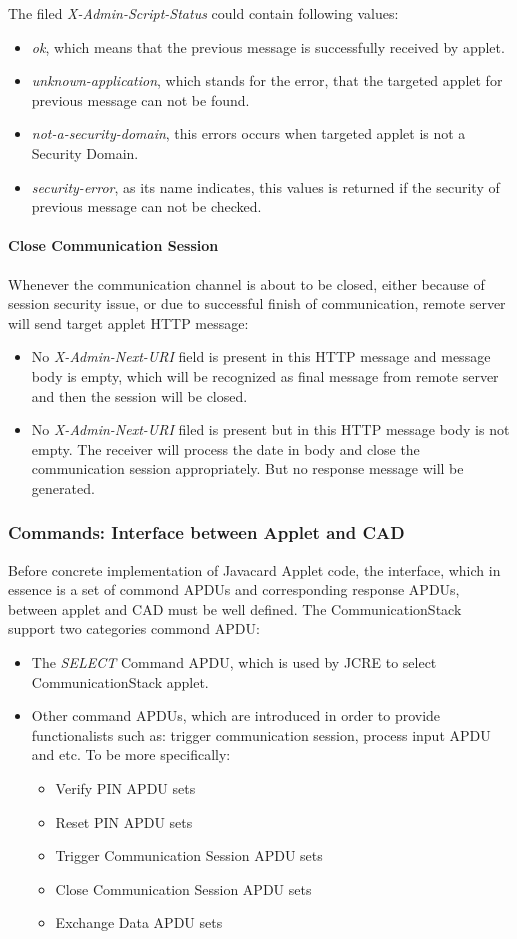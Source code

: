 \documentclass[]{llncs}
\begin{document}
The filed \emph{X-Admin-Script-Status} could contain following values:
 \begin{itemize}
  \item \emph{ok}, which means that the previous message is successfully received by applet.
  \item \emph{unknown-application}, which stands for the error, that the targeted applet for previous message can not be found.
\item \emph{not-a-security-domain}, this errors occurs when targeted applet is not a Security Domain.
\item \emph{security-error}, as its name indicates, this values is returned if the security of previous message  can not be checked.
\end{itemize}

\paragraph{Close Communication Session}
Whenever the communication channel is about to be closed, either because of session security issue, or due to successful finish of communication, remote server will send target applet HTTP message:
 \begin{itemize}
  \item No \emph{X-Admin-Next-URI} field is present in this HTTP message and message body is empty, which will be recognized as final message from remote server and then the session will be closed.
  \item No \emph{X-Admin-Next-URI} filed is present but in this HTTP message body is not empty. The receiver will process the date in body and close the communication session appropriately. But no response message will be generated.
\end{itemize}

\subsubsection {Commands: Interface between Applet and CAD}
Before concrete implementation of Javacard Applet code, the interface, which in essence is a set of commond APDUs and corresponding response APDUs, between applet and CAD must be well defined.  The CommunicationStack support two categories commond APDU:
 \begin{itemize}
  \item The \emph{SELECT} Command APDU, which is used by JCRE to select CommunicationStack applet.
  \item Other command APDUs, which are introduced in order to provide functionalists such as: trigger communication session, process input APDU and etc. To be more specifically:
\begin{itemize}
  \item Verify PIN APDU sets
  \item Reset PIN APDU sets
  \item Trigger Communication Session APDU sets
  \item Close Communication Session APDU sets
  \item Exchange Data APDU sets
\end{itemize}
\end{itemize}
\end{document}

